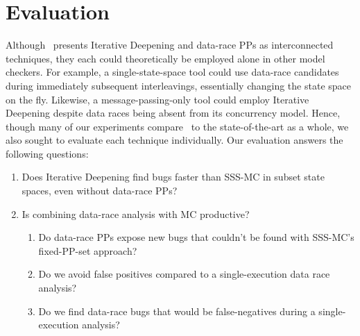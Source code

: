 
\section{Evaluation}

Although \quicksand~presents Iterative Deepening and data-race PPs as interconnected techniques, they each could theoretically be employed alone in other model checkers.
For example, a single-state-space tool could use data-race candidates during immediately subsequent interleavings, essentially changing the state space on the fly.
Likewise, a message-passing-only tool could employ Iterative Deepening despite data races being absent from its concurrency model.
Hence, though many of our experiments compare \quicksand~to the state-of-the-art as a whole,
we also sought to evaluate each technique individually.
Our evaluation answers the following questions:
\begin{enumerate}
	\item Does Iterative Deepening find bugs faster than SSS-MC in subset state spaces, even without data-race PPs?
	\item Is combining data-race analysis with MC productive?
		\begin{enumerate}
			\item Do data-race PPs expose new bugs that couldn't be found with SSS-MC's fixed-PP-set approach?
			\item Do we avoid false positives compared to a single-execution data race analysis?
			\item Do we find data-race bugs that would be false-negatives during a single-execution analysis?%
		\end{enumerate}
\end{enumerate}
